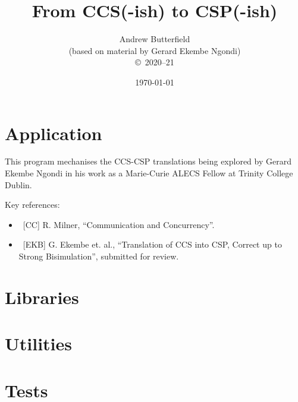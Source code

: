 \documentclass[fleqn,10pt]{report}
\author{
Andrew Butterfield
\\(based on material by Gerard Ekembe Ngondi)
\\
{\small \copyright\ 2020--21}
}
\title{
  From CCS(-ish) to CSP(-ish)
}
\date{
\today
}
\begin{document}
\maketitle
\setcounter{tocdepth}{4}
\tableofcontents


\chapter{Application}

This program mechanises the CCS-CSP translations
being explored by Gerard Ekembe Ngondi
in his work as a Marie-Curie ALECS Fellow at Trinity College Dublin.

Key references:
\begin{itemize}
  \item ~[CC] R. Milner, ``Communication and Concurrency''.
  \item ~[EKB]  G. Ekembe et. al., ``Translation of CCS into CSP, Correct up to
Strong Bisimulation'', submitted for review.
\end{itemize}


\chapter{Libraries}

\newpage
\newpage
\newpage

\appendix

\chapter{Utilities}



\chapter{Tests}

\newpage

% 



\end{document}
